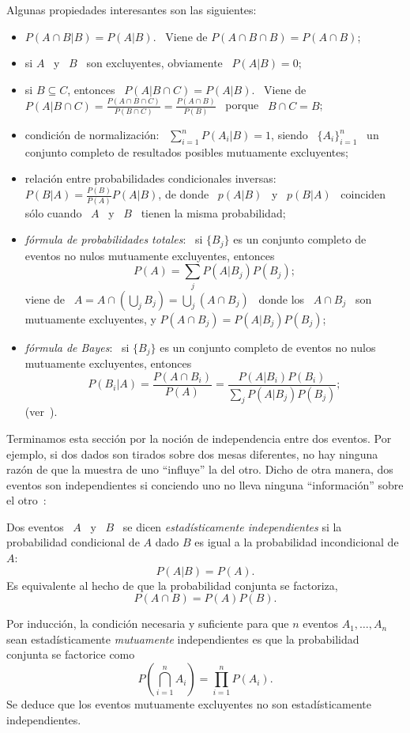 Algunas propiedades interesantes son las siguientes:
%
\begin{itemize}
\item $P(A \cap B | B) = P(A|B)$. \ Viene de $P(A \cap B \cap B) = P(A \cap B)$;
%
\item si $A$ \ y \ $B$ \ son excluyentes, obviamente \ $P(A|B) = 0$;
%
\item si $B \subseteq  C$, entonces \ $P(A | B \cap C) =  P(A|B)$.  \ Viene de \
  $P(A |  B \cap C) =  \frac{P(A \cap B \cap  C)}{P(B \cap C)}  = \frac{P(A \cap
    B)}{P(B)}$ \ porque \ $B \cap C = B$;
%
\item condici\'on  de normalizaci\'on: \  $\sum_{i=1}^n P(A_i|B) = 1$,  siendo \
  $\{ A_i \}_{i=1}^n$  \ un conjunto completo de  resultados posibles mutuamente
  excluyentes;
%
\item relaci\'on  entre probabilidades condicionales  inversas: \ $\displaystyle
  P(B|A)  = \frac{P(B)}{P(A)}  P(A|B)$, de  donde \  $p(A|B)$ \  y \  $p(B|A)$ \
  coinciden s\'olo cuando \ $A$ \ y \ $B$ \ tienen la misma probabilidad;
%
\item {\it f\'ormula de probabilidades totales}: \ si $\{ B_j \}$ es un conjunto
  completo de eventos no nulos mutuamente excluyentes, entonces
  \[
  P(A) = \sum_j P(A|B_j) P(B_j);
  \]
  viene de \ $A = A \cap  \left( \bigcup_j B_j \right) = \bigcup_j \left( A \cap
    B_j \right)$  \ donde  los \ $A  \cap B_j$  \ son mutuamente  excluyentes, y
  $P\left( A \cap B_j \right) = P(A|B_j) P(B_j)$;
%
\item {\it  f\'ormula de Bayes}:  \ si  $\{ B_j \}$  es un conjunto  completo de
  eventos no nulos mutuamente excluyentes, entonces
  \[
  P(B_i|A) = \frac{P(A \cap B_i)}{P(A)} = \frac{P(A|B_i) P(B_i)}{\sum_j P(A|B_j)
    P(B_j)};
  \]
  (ver~\cite{Bre88, JacPro03, Bay63, Bar58}).
\end{itemize}

Terminamos  esta   secci\'on  por  la   noci\'on  de  independencia   entre  dos
eventos. Por  ejemplo, si dos dados  son tirados sobre dos  mesas diferentes, no
hay ninguna raz\'on de  que la muestra de uno ``influye'' la  del otro. Dicho de
otra manera,  dos eventos son independientes  si conciendo uno  no lleva ninguna
``informaci\'on'' sobre el otro~\cite{Bre88, ManWol95, Hau01, JacPro03, Bor09}:
%
\begin{definicion}[Independencia estad\'istica]
  Dos eventos \ $A$ \ y \ $B$ \ se dicen {\it estad\'isticamente independientes}
  si la  probabilidad condicional  de $A$  dado $B$ es  igual a  la probabilidad
  incondicional de $A$:
  \[
   P(A|B) = P(A).
   \]
   Es equivalente al hecho de que la probabilidad conjunta se factoriza,
  \[
   P(A \cap B) = P(A) P(B).
   \]
\end{definicion}
%
Por  inducci\'on, la  condici\'on necesaria  y suficiente  para que  $n$ eventos
$A_1,\ldots,A_n$ sean estad\'isticamente {\em mutuamente} independientes es que
la probabilidad conjunta se factorice como
%
\[
P\left( \bigcap_{i=1}^n A_i \right) = \prod_{i=1}^n P(A_i).
\]
%
Se  deduce que  los  eventos mutuamente  excluyentes  no son  estad\'isticamente
independientes.

